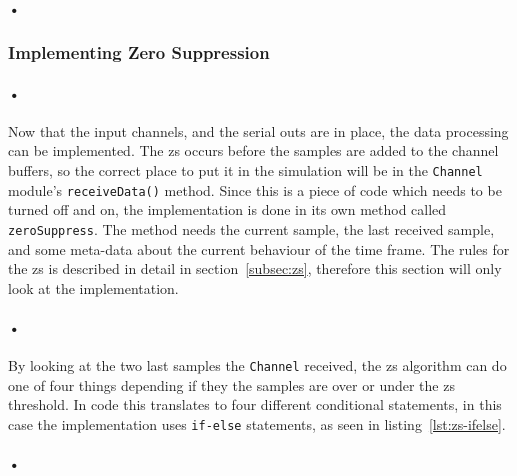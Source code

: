 \documentclass[a4paper, 12pt]{report}
\newcommand{\codeword}[1]{\texttt{#1}}
\begin{document}
\paragraph{•}
\begin{minipage}{\linewidth}

\end{minipage}

\subsubsection{Implementing Zero Suppression}

\paragraph{•} 
Now that the input channels, and the serial outs are in place, the data processing can be implemented.
The \gls{zs} occurs before the samples are added to the channel buffers, so the correct place to put it in the simulation will be in the \codeword{Channel} module's \codeword{receiveData()} method.
Since this is a piece of code which needs to be turned off and on, the implementation is done in its own method called \codeword{zeroSuppress}.
The method needs the current sample, the last received sample, and some meta-data about the current behaviour of the time frame.
The rules for the \gls{zs} is described in detail in section~\ref{subsec:zs}, therefore this section will only look at the implementation.

\paragraph{•}
By looking at the two last samples the \codeword{Channel} received, the \gls{zs} algorithm can do one of four things depending if they the samples are over or under the \gls{zs} threshold.
In code this translates to four different conditional statements, in this case the implementation uses \codeword{if-else} statements, as seen in listing~\ref{lst:zs-ifelse}.

\paragraph{•}
\begin{minipage}{\linewidth}

\end{minipage}
\end{document}
